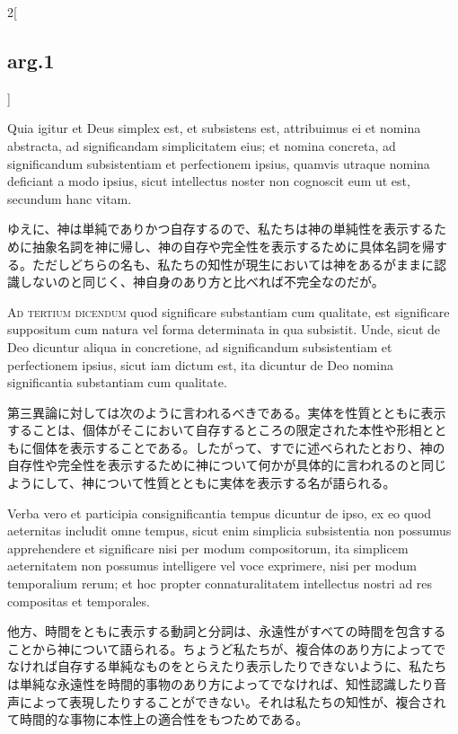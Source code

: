 \documentclass[paper=a4paper,fontsize=10pt,jafontsize=9pt,titlepage]{jlreq}
\begin{document}
\begin{paracol}{2}[\subsection{arg.1}]
\switchcolumn*

Quia igitur et Deus simplex est, et subsistens est, attribuimus ei et
nomina abstracta, ad significandam simplicitatem eius; et nomina
concreta, ad significandum subsistentiam et perfectionem ipsius,
quamvis utraque nomina deficiant a modo ipsius, sicut intellectus
noster non cognoscit eum ut est, secundum hanc vitam.

\switchcolumn

ゆえに、神は単純でありかつ自存するので、私たちは神の単純性を表示するた
めに抽象名詞を神に帰し、神の自存や完全性を表示するために具体名詞を帰す
る。ただしどちらの名も、私たちの知性が現生においては神をあるがままに認
識しないのと同じく、神自身のあり方と比べれば不完全なのだが。

\switchcolumn*[\subsection{ad.3}]

{\scshape Ad tertium dicendum} quod significare substantiam cum qualitate,
est significare suppositum cum natura vel forma determinata in qua
subsistit. Unde, sicut de Deo dicuntur aliqua in concretione, ad
significandum subsistentiam et perfectionem ipsius, sicut iam dictum
est, ita dicuntur de Deo nomina significantia substantiam cum
qualitate.

\switchcolumn

第三異論に対しては次のように言われるべきである。実体を性質とともに表示
することは、個体がそこにおいて自存するところの限定された本性や形相とと
もに個体を表示することである。したがって、すでに述べられたとおり、神の
自存性や完全性を表示するために神について何かが具体的に言われるのと同じ
ようにして、神について性質とともに実体を表示する名が語られる。

\switchcolumn*

Verba vero et participia consignificantia tempus dicuntur de ipso, ex
eo quod aeternitas includit omne tempus, sicut enim simplicia
subsistentia non possumus apprehendere et significare nisi per modum
compositorum, ita simplicem aeternitatem non possumus intelligere vel
voce exprimere, nisi per modum temporalium rerum; et hoc propter
connaturalitatem intellectus nostri ad res compositas et temporales.

\switchcolumn

他方、時間をともに表示する動詞と分詞は、永遠性がすべての時間を包含する
ことから神について語られる。ちょうど私たちが、複合体のあり方によってで
なければ自存する単純なものをとらえたり表示したりできないように、私たち
は単純な永遠性を時間的事物のあり方によってでなければ、知性認識したり音
声によって表現したりすることができない。それは私たちの知性が、複合され
て時間的な事物に本性上の適合性をもつためである。


\end{paracol}
\end{document}
